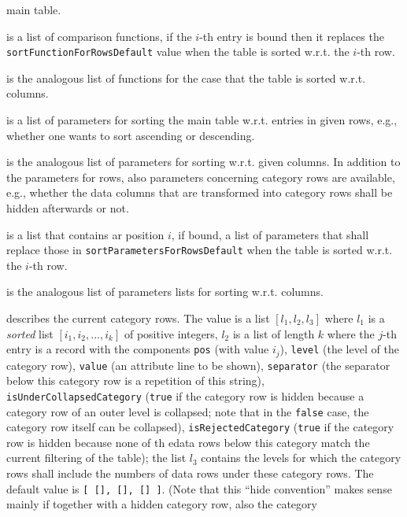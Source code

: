 \documentclass[a4paper,11pt]{report}
\begin{document}
{{{\begin{description}
main table. 
\item[{\texttt{sortFunctionsForRows}}]  is a list of comparison functions, if the $i$-th entry is bound then it replaces the \texttt{sortFunctionForRowsDefault} value when the table is sorted w.r.t. the $i$-th row. 
\item[{\texttt{sortFunctionsForColumns}}]  is the analogous list of functions for the case that the table is sorted
w.r.t. columns. 
\item[{\texttt{sortParametersForRowsDefault}}]  is a list of parameters for sorting the main table w.r.t. entries in given
rows, e.{\nobreakspace}g., whether one wants to sort ascending or descending. 
\item[{\texttt{sortParametersForColumnsDefault}}]  is the analogous list of parameters for sorting w.r.t. given columns. In
addition to the parameters for rows, also parameters concerning category rows
are available, e.{\nobreakspace}g., whether the data columns that are
transformed into category rows shall be hidden afterwards or not. 
\item[{\texttt{sortParametersForRows}}]  is a list that contains ar position $i$, if bound, a list of parameters that shall replace those in \texttt{sortParametersForRowsDefault} when the table is sorted w.r.t. the $i$-th row. 
\item[{\texttt{sortParametersForColumns}}]  is the analogous list of parameters lists for sorting w.r.t. columns. 
\item[{\texttt{categories}}]  describes the current category rows. The value is a list $[ l_1, l_2, l_3 ]$ where $l_1$ is a \emph{sorted} list $[ i_1, i_2, ..., i_k ]$ of positive integers, $l_2$ is a list of length $k$ where the $j$-th entry is a record with the components \texttt{pos} (with value $i_j$), \texttt{level} (the level of the category row), \texttt{value} (an attribute line to be shown), \texttt{separator} (the separator below this category row is a repetition of this string), \texttt{isUnderCollapsedCategory} (\texttt{true} if the category row is hidden because a category row of an outer level is
collapsed; note that in the \texttt{false} case, the category row itself can be collapsed), \texttt{isRejectedCategory} (\texttt{true} if the category row is hidden because none of th edata rows below this
category match the current filtering of the table); the list $l_3$ contains the levels for which the category rows shall include the numbers of
data rows under these category rows. The default value is \texttt{[ [], [], [] ]}. (Note that this ``hide convention'' makes sense mainly if together with a hidden category row, also the category

\end{description}}}}
\end{document}
